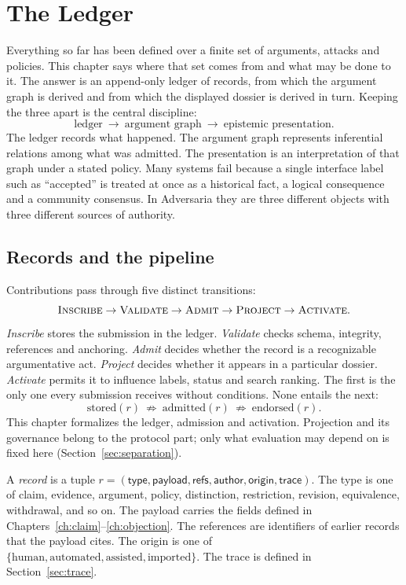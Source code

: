 \chapter{The Ledger}\label{ch:ledger}

Everything so far has been defined over a finite set of arguments, attacks and policies. This chapter says where that set comes from and what may be done to it. The answer is an append-only ledger of records, from which the argument graph is derived and from which the displayed dossier is derived in turn. Keeping the three apart is the central discipline:
\[
\text{ledger}\ \longrightarrow\ \text{argument graph}\ \longrightarrow\ \text{epistemic presentation}.
\]
The ledger records what happened. The argument graph represents inferential relations among what was admitted. The presentation is an interpretation of that graph under a stated policy. Many systems fail because a single interface label such as ``accepted'' is treated at once as a historical fact, a logical consequence and a community consensus. In Adversaria they are three different objects with three different sources of authority.

\section{Records and the pipeline}

Contributions pass through five distinct transitions:
\[
\textsc{Inscribe}\to\textsc{Validate}\to\textsc{Admit}\to\textsc{Project}\to\textsc{Activate}.
\]
\emph{Inscribe} stores the submission in the ledger. \emph{Validate} checks schema, integrity, references and anchoring. \emph{Admit} decides whether the record is a recognizable argumentative act. \emph{Project} decides whether it appears in a particular dossier. \emph{Activate} permits it to influence labels, status and search ranking. The first is the only one every submission receives without conditions. None entails the next:
\[
\mathrm{stored}(r)\ \not\Rightarrow\ \mathrm{admitted}(r)\ \not\Rightarrow\ \mathrm{endorsed}(r).
\]
This chapter formalizes the ledger, admission and activation. Projection and its governance belong to the protocol part; only what evaluation may depend on is fixed here (Section~\ref{sec:separation}).

\begin{definition}[Record]\label{def:record}
A \emph{record} is a tuple $r=(\mathsf{type},\mathsf{payload},\mathsf{refs},\mathsf{author},\mathsf{origin},\mathsf{trace})$. The type is one of claim, evidence, argument, policy, distinction, restriction, revision, equivalence, withdrawal, and so on. The payload carries the fields defined in Chapters~\ref{ch:claim}--\ref{ch:objection}. The references are identifiers of earlier records that the payload cites. The origin is one of $\{\text{human},\text{automated},\text{assisted},\text{imported}\}$. The trace is defined in Section~\ref{sec:trace}.
\end{definition}

